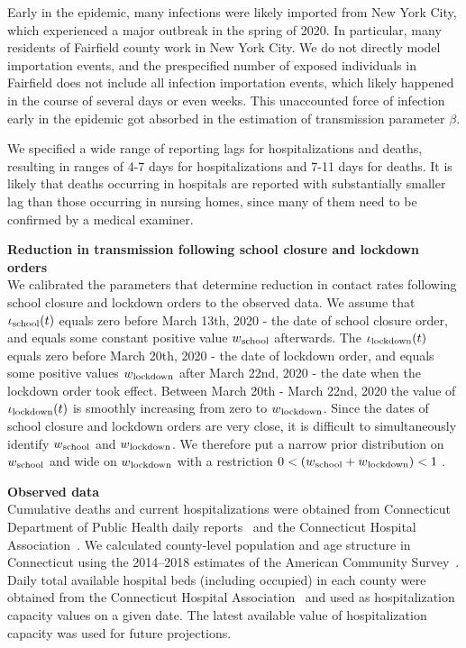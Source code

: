 \documentclass[11pt]{article}
\begin{document}
Early in the epidemic, many infections were likely imported from New York City, which experienced a major outbreak in the spring of 2020. In particular, many residents of Fairfield county work in New York City. We do not directly model importation events, and the prespecified number of exposed individuals in Fairfield does not include all infection importation events, which likely happened in the course of several days or even weeks. This unaccounted force of infection early in the epidemic got absorbed in the estimation of transmission parameter $\beta$.

We specified a wide range of reporting lags for hospitalizations and deaths, resulting in ranges of 4-7 days for hospitalizations and 7-11 days for deaths. It is likely that deaths occurring in hospitals are reported with substantially smaller lag than those occurring in nursing homes, since many of them need to be confirmed by a medical examiner.  

\textbf{Reduction in transmission following school closure and lockdown orders} \\[0.5em]
We calibrated the parameters that determine reduction in contact rates following school closure and lockdown orders to the observed data. 
We assume that $\iota\textsubscript{school}(t)$ equals zero before March 13th, 2020 - the date of school closure order, and equals some constant positive value $w\textsubscript{school}$ afterwards. 
The  $\iota\textsubscript{lockdown} (t)$ equals zero before March 20th, 2020 - the date of lockdown order, and equals some positive values $w\textsubscript{lockdown}$ after March 22nd, 2020 - the date when the lockdown order took effect. Between March 20th - March 22nd, 2020 the value of $\iota\textsubscript{lockdown} (t)$ is smoothly increasing from zero to $w\textsubscript{lockdown}$. 
Since the dates of school closure and lockdown orders are very close, it is difficult to simultaneously identify $w\textsubscript{school}$ and $w\textsubscript{lockdown}$. We therefore put a narrow prior distribution on $w\textsubscript{school}$ and wide on $w\textsubscript{lockdown}$ with a restriction $ 0 < (w\textsubscript{school} + w\textsubscript{lockdown}) < 1$ . 


\textbf{Observed data} \\[0.5em]
Cumulative deaths and current hospitalizations were obtained from Connecticut Department of Public Health daily reports~\citep{DPHwebsite} and the Connecticut Hospital Association~\citep{CHAwebsite}. 
We calculated county-level population and age structure in Connecticut using the 2014--2018 estimates of the American Community Survey~\citep{acs2018}. 
Daily total available hospital beds (including occupied) in each county were obtained from the Connecticut Hospital Association~\citep{CHAwebsite} and used as hospitalization capacity values on a given date. The latest available value of hospitalization capacity was used for future projections.
\end{document}

